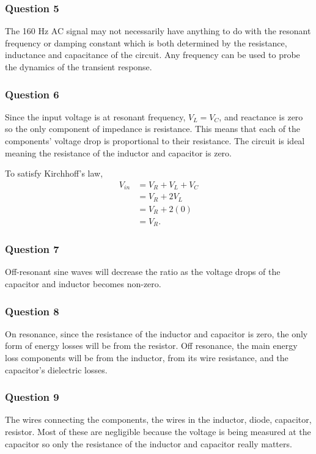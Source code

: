 \documentclass{article}
\begin{document}
\subsubsection{Question 5}
The 160 Hz AC signal may not necessarily have anything to do with the resonant frequency
or damping constant which is both determined by the resistance, inductance and capacitance
of the circuit. Any frequency can be used to probe the dynamics of the transient response.

\subsubsection{Question 6}
Since the input voltage is at resonant frequency, $V_L =V_C$, and reactance is zero 
so the only component of impedance is resistance. This means that each of the components' 
voltage drop is proportional to their resistance. The circuit is ideal meaning the resistance
of the inductor and capacitor is zero.

To satisfy Kirchhoff's law,
\begin{equation}
    \begin{split}
    V_{in} &= V_R + V_L + V_C \\
    &= V_R + 2V_L \\
    &= V_R + 2(0) \\
    &= V_R.
    \end{split}
\end{equation}

\subsubsection{Question 7}
Off-resonant sine waves will decrease the ratio as the voltage drops of the capacitor and 
inductor becomes non-zero.

\subsubsection{Question 8}
On resonance, since the resistance of the inductor and capacitor is zero, the only form of 
energy losses will be from the resistor. Off resonance, the main energy loss components will
be from the inductor, from its wire resistance, and the capacitor's dielectric losses.

\subsubsection{Question 9}
The wires connecting the components, the wires in the inductor, diode, capacitor, resistor. 
Most of these are negligible because the voltage is being measured at the capacitor so only
the resistance of the inductor and capacitor really matters.
\end{document}
